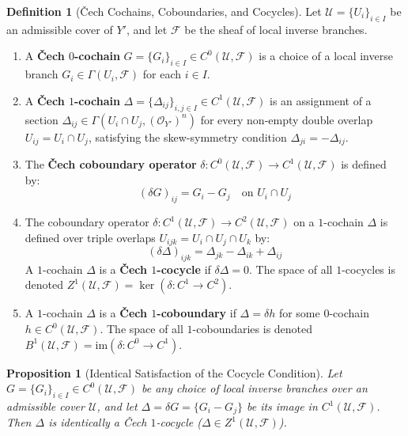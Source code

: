 \documentclass[11pt,reqno]{amsart}
\newtheorem{proposition}[theorem]{Proposition}
\theoremstyle{definition}
\newtheorem{definition}[theorem]{Definition}
\begin{document}
\begin{definition}[\v{C}ech Cochains, Coboundaries, and Cocycles]
Let $\mathcal{U} = \{U_i\}_{i \in I}$ be an admissible cover of $Y'$, and let $\mathcal{F}$ be the sheaf of local inverse branches.
\begin{enumerate}
    \item A \textbf{\v{C}ech $0$-cochain} $G = \{G_i\}_{i \in I} \in C^0(\mathcal{U}, \mathcal{F})$ is a choice of a local inverse branch $G_i \in \Gamma(U_i, \mathcal{F})$ for each $i \in I$.
    \item A \textbf{\v{C}ech $1$-cochain} $\Delta = \{\Delta_{ij}\}_{i,j \in I} \in C^1(\mathcal{U}, \mathcal{F})$ is an assignment of a section $\Delta_{ij} \in \Gamma(U_i \cap U_j, (\mathcal{O}_{Y'})^n)$ for every non-empty double overlap $U_{ij} = U_i \cap U_j$, satisfying the skew-symmetry condition $\Delta_{ji} = -\Delta_{ij}$.
    \item The \textbf{\v{C}ech coboundary operator} $\delta: C^0(\mathcal{U}, \mathcal{F}) \to C^1(\mathcal{U}, \mathcal{F})$ is defined by:
    $$(\delta G)_{ij} = G_i - G_j \quad \text{on } U_i \cap U_j$$
    \item The coboundary operator $\delta: C^1(\mathcal{U}, \mathcal{F}) \to C^2(\mathcal{U}, \mathcal{F})$ on a $1$-cochain $\Delta$ is defined over triple overlaps $U_{ijk} = U_i \cap U_j \cap U_k$ by:
    $$(\delta \Delta)_{ijk} = \Delta_{jk} - \Delta_{ik} + \Delta_{ij}$$
    A $1$-cochain $\Delta$ is a \textbf{\v{C}ech $1$-cocycle} if $\delta \Delta = 0$. The space of all $1$-cocycles is denoted $Z^1(\mathcal{U}, \mathcal{F}) = \ker(\delta: C^1 \to C^2)$.
    \item A $1$-cochain $\Delta$ is a \textbf{\v{C}ech $1$-coboundary} if $\Delta = \delta h$ for some $0$-cochain $h \in C^0(\mathcal{U}, \mathcal{F})$. The space of all $1$-coboundaries is denoted $B^1(\mathcal{U}, \mathcal{F}) = \mathrm{im}(\delta: C^0 \to C^1)$.
\end{enumerate}
\end{definition}

\begin{proposition}[Identical Satisfaction of the Cocycle Condition]
Let $G = \{G_i\}_{i \in I} \in C^0(\mathcal{U}, \mathcal{F})$ be any choice of local inverse branches over an admissible cover $\mathcal{U}$, and let $\Delta = \delta G = \{G_i - G_j\}$ be its image in $C^1(\mathcal{U}, \mathcal{F})$. Then $\Delta$ is identically a \v{C}ech $1$-cocycle ($\Delta \in Z^1(\mathcal{U}, \mathcal{F})$).
\end{proposition}
\end{document}
